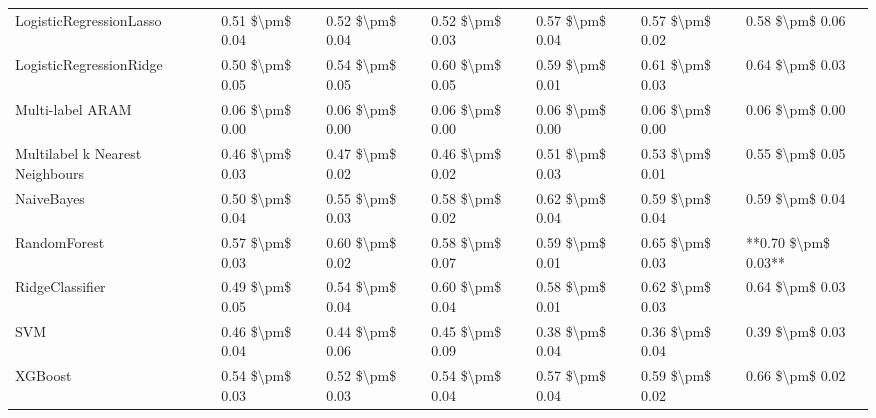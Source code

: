 \begin{tabular}{lllllll}
LogisticRegressionLasso         &  0.51 \$\textbackslash pm\$ 0.04 &           0.52 \$\textbackslash pm\$ 0.04 &       0.52 \$\textbackslash pm\$ 0.03 &        0.57 \$\textbackslash pm\$ 0.04 &                         0.57 \$\textbackslash pm\$ 0.02 &      0.58 \$\textbackslash pm\$ 0.06 \\
LogisticRegressionRidge         &  0.50 \$\textbackslash pm\$ 0.05 &           0.54 \$\textbackslash pm\$ 0.05 &       0.60 \$\textbackslash pm\$ 0.05 &        0.59 \$\textbackslash pm\$ 0.01 &                         0.61 \$\textbackslash pm\$ 0.03 &      0.64 \$\textbackslash pm\$ 0.03 \\
Multi-label ARAM                &  0.06 \$\textbackslash pm\$ 0.00 &           0.06 \$\textbackslash pm\$ 0.00 &       0.06 \$\textbackslash pm\$ 0.00 &        0.06 \$\textbackslash pm\$ 0.00 &                         0.06 \$\textbackslash pm\$ 0.00 &      0.06 \$\textbackslash pm\$ 0.00 \\
Multilabel k Nearest Neighbours &  0.46 \$\textbackslash pm\$ 0.03 &           0.47 \$\textbackslash pm\$ 0.02 &       0.46 \$\textbackslash pm\$ 0.02 &        0.51 \$\textbackslash pm\$ 0.03 &                         0.53 \$\textbackslash pm\$ 0.01 &      0.55 \$\textbackslash pm\$ 0.05 \\
NaiveBayes                      &  0.50 \$\textbackslash pm\$ 0.04 &           0.55 \$\textbackslash pm\$ 0.03 &       0.58 \$\textbackslash pm\$ 0.02 &        0.62 \$\textbackslash pm\$ 0.04 &                         0.59 \$\textbackslash pm\$ 0.04 &      0.59 \$\textbackslash pm\$ 0.04 \\
RandomForest                    &  0.57 \$\textbackslash pm\$ 0.03 &           0.60 \$\textbackslash pm\$ 0.02 &       0.58 \$\textbackslash pm\$ 0.07 &        0.59 \$\textbackslash pm\$ 0.01 &                         0.65 \$\textbackslash pm\$ 0.03 &  **0.70 \$\textbackslash pm\$ 0.03** \\
RidgeClassifier                 &  0.49 \$\textbackslash pm\$ 0.05 &           0.54 \$\textbackslash pm\$ 0.04 &       0.60 \$\textbackslash pm\$ 0.04 &        0.58 \$\textbackslash pm\$ 0.01 &                         0.62 \$\textbackslash pm\$ 0.03 &      0.64 \$\textbackslash pm\$ 0.03 \\
SVM                             &  0.46 \$\textbackslash pm\$ 0.04 &           0.44 \$\textbackslash pm\$ 0.06 &       0.45 \$\textbackslash pm\$ 0.09 &        0.38 \$\textbackslash pm\$ 0.04 &                         0.36 \$\textbackslash pm\$ 0.04 &      0.39 \$\textbackslash pm\$ 0.03 \\
XGBoost                         &  0.54 \$\textbackslash pm\$ 0.03 &           0.52 \$\textbackslash pm\$ 0.03 &       0.54 \$\textbackslash pm\$ 0.04 &        0.57 \$\textbackslash pm\$ 0.04 &                         0.59 \$\textbackslash pm\$ 0.02 &      0.66 \$\textbackslash pm\$ 0.02 \\
\bottomrule
\end{tabular}

